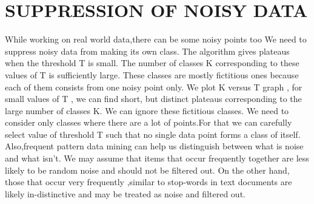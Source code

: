 \documentclass[letterpaper, 10 pt, conference]{ieeeconf}  %
\begin{document}
\section{SUPPRESSION OF NOISY DATA}
While working on real world data,there can be some noisy points too 
We need to suppress noisy data from making its own class.
The algorithm gives plateaus when the threshold T is small. The number of classes K corresponding to these values of T is sufficiently large. These classes are mostly fictitious ones because each of them consists from one noisy point only.
We plot K versus T graph , for small values of T , we can find  short, but distinct plateaus corresponding to the large number of classes K. We can ignore these fictitious classes. We need to consider only classes where there are a lot of points.For that we can carefully select value of threshold T such that no single data point forms a class of itself. 
Also,frequent pattern data mining can help us distinguish between what is noise and what isn’t. We may assume that items that occur frequently together are less likely to be random noise and should not be filtered out.
On the other hand, those that occur very frequently ,similar to stop-words in text documents are likely in-distinctive and may be treated as noise and  filtered out. 
\end{document}
